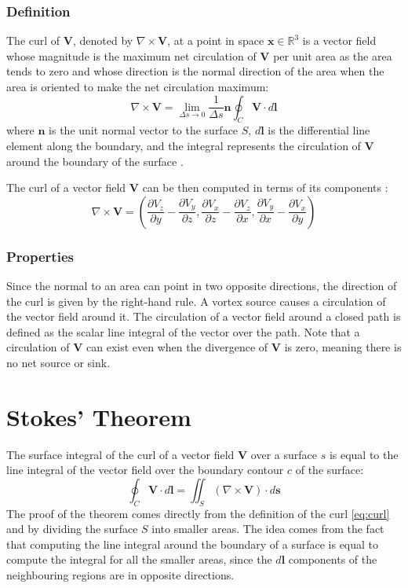 \subsubsection{Definition}
The curl of \(\mathbf{V}\), denoted by \(\nabla \times \mathbf{V}\), at a point in 
space \(\mathbf{x} \in \mathbb{R}^3\) is a vector field whose magnitude is the 
maximum net circulation of \(\mathbf{V}\) per unit area as the area tends to zero 
and whose direction is the normal direction of the area when the area is oriented 
to make the net circulation maximum:
\begin{equation}
\nabla \times \mathbf{V} = \lim_{\Delta s \to 0} \frac{1}{\Delta s} \mathbf{n} 
\oint_{C} \mathbf{V} \cdot d\mathbf{l}
\label{eq:curl}
\end{equation}
where \(\mathbf{n}\) is the unit normal vector to the surface \(S\), \(d\mathbf{l}\) 
is the differential line element along the boundary, and the integral represents 
the circulation of \(\mathbf{V}\) around the boundary of the surface 
\cite{book-magnetism}.

The curl of a vector field \(\mathbf{V}\) can be then computed in terms of its 
components \cite{math-book}:
\begin{equation}
\nabla \times \mathbf{V} = \left( \frac{\partial V_z}{\partial y} - \frac{\partial 
V_y}{\partial z}, \frac{\partial V_x}{\partial z} - \frac{\partial V_z}{\partial 
x}, \frac{\partial V_y}{\partial x} - \frac{\partial V_x}{\partial y} \right)
\end{equation}

\subsubsection{Properties}
Since the normal to an area can point in two opposite directions, the direction 
of the curl is given by the right-hand rule.
A vortex source causes a circulation of the vector field around it. The 
circulation of a vector field around a closed path is defined as the scalar line 
integral of the vector over the path. Note that a circulation of \(\mathbf{V}\) 
can exist even when the divergence of \(\mathbf{V}\) is zero, meaning there is no 
net source or sink.

\section{Stokes' Theorem} \label{Stokes' Theorem}
The surface integral of the curl of a vector field \(\mathbf{V}\) over a surface 
\( s \) is equal to the line integral of the vector field over the boundary 
contour \( c \) of the surface:
\begin{equation}
\oint_C \mathbf{V} \cdot d\mathbf{l} = \iint_S (\nabla \times \mathbf{V}) \cdot 
d\mathbf{s}
\label{eq:stokes}
\end{equation}
The proof of the theorem comes directly from the definition of the curl 
\ref{eq:curl} and by dividing the surface $S$ into smaller areas. The idea comes 
from the fact that computing the line integral around the boundary of a surface 
is equal to compute the integral for all the smaller areas, since the 
\(d\mathbf{l}\) components of the neighbouring regions are in opposite 
directions.

